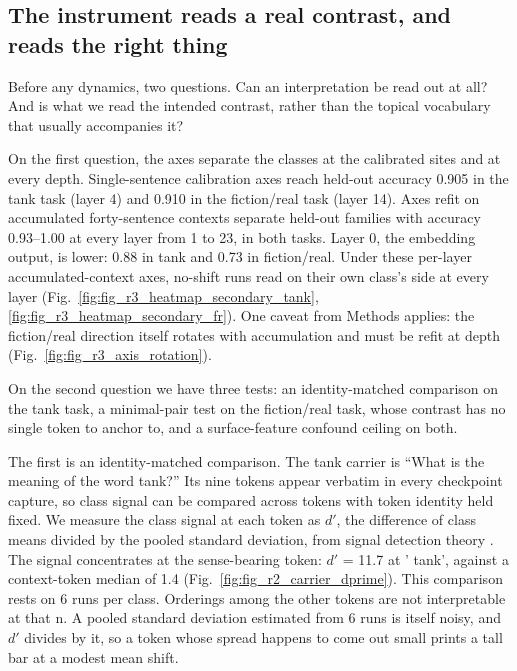 \documentclass[11pt]{article}
\begin{document}
\subsection{The instrument reads a real contrast, and reads the right thing}

Before any dynamics, two questions. Can an interpretation be read out at all? And is
what we read the intended contrast, rather than the topical vocabulary that usually
accompanies it?

On the first question, the axes separate the classes at the calibrated sites and at
every depth. Single-sentence calibration axes reach held-out accuracy 0.905 in the
tank task (layer 4) and 0.910 in the fiction/real task (layer 14). Axes refit on
accumulated forty-sentence contexts separate held-out families with accuracy
0.93–1.00 at every layer from 1 to 23, in both tasks. Layer 0, the embedding output,
is lower: 0.88 in tank and 0.73 in fiction/real. Under these per-layer
accumulated-context axes, no-shift runs read on their own class's side at every layer
(Fig.~\ref{fig:fig_r3_heatmap_secondary_tank}, \ref{fig:fig_r3_heatmap_secondary_fr}). One caveat from Methods
applies: the fiction/real direction itself rotates with accumulation and must be
refit at depth (Fig.~\ref{fig:fig_r3_axis_rotation}).

On the second question we have three tests: an identity-matched comparison on the
tank task, a minimal-pair test on the fiction/real task, whose contrast has no single
token to anchor to, and a surface-feature confound ceiling on both.

The first is an identity-matched comparison. The tank carrier is ``What is the meaning of the word tank?'' Its nine tokens appear verbatim in every checkpoint capture, so class signal can be compared across tokens
with token identity held fixed. We measure the class signal at each token as $d'$, the difference of class means
divided by the pooled standard deviation, from signal detection theory \citep{green1966}. The signal concentrates at the sense-bearing token: $d'$ = 11.7 at
' tank', against a context-token median of 1.4 (Fig.~\ref{fig:fig_r2_carrier_dprime}). This comparison rests on 6 runs per class. Orderings
among the other tokens are not interpretable at that n. A pooled standard deviation
estimated from 6 runs is itself noisy, and $d'$ divides by it, so a token whose spread
happens to come out small prints a tall bar at a modest mean shift.
\end{document}
